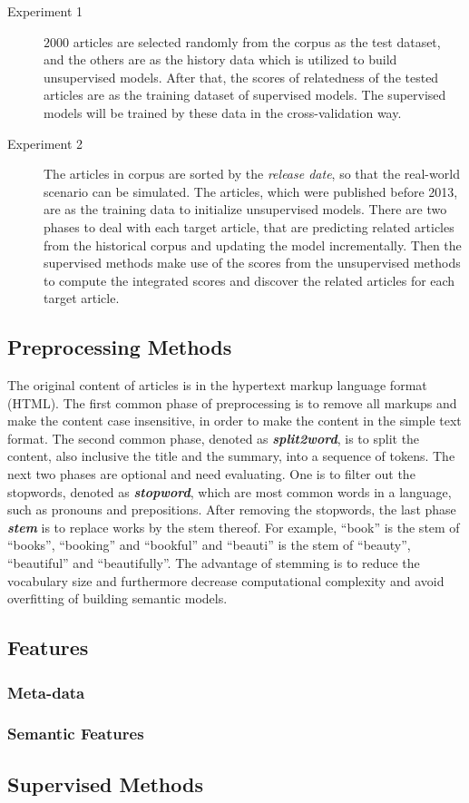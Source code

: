 \begin{description}
\item[Experiment 1] $2000$ articles are selected randomly from the corpus as the test dataset, and the others are as the history data which is utilized to build unsupervised models. After that, the scores of relatedness of the tested articles are as the training dataset of supervised models. The supervised models will be trained by these data in the cross-validation way. 
\item[Experiment 2] The articles in corpus are sorted by the \textit{release date}, so that the real-world scenario can be simulated. The articles, which were published before 2013, are as the training data to initialize unsupervised models. There are two phases to deal with each target article, that are predicting related articles from the historical corpus and updating the model incrementally. Then the supervised methods make use of the scores from the unsupervised methods to compute the integrated scores and discover the related articles for each target article. 
\end{description}

\subsection{Preprocessing Methods}

The original content of articles is in the hypertext markup language format (HTML). The first common phase of preprocessing is to remove all markups and make the content case insensitive, in order to make the content in the simple text format. The second common phase, denoted as \textbf{\textit{split2word}}, is to split the content, also inclusive the title and the summary, into a sequence of tokens. The next two phases are optional and need evaluating. One is to filter out the stopwords, denoted as \textbf{\textit{stopword}}, which are most common words in a language, such as pronouns and prepositions. After removing the stopwords, the last phase \textbf{\textit{stem}} is to replace works by the stem thereof. For example, ``book'' is the stem of ``books'', ``booking'' and ``bookful'' and ``beauti'' is the stem of ``beauty'', ``beautiful'' and ``beautifully''. The advantage of stemming is to reduce the vocabulary size and furthermore decrease computational complexity and avoid overfitting of building semantic models. 

\subsection{Features}

\subsubsection{Meta-data}

\subsubsection{Semantic Features}

\subsection{Supervised Methods}


